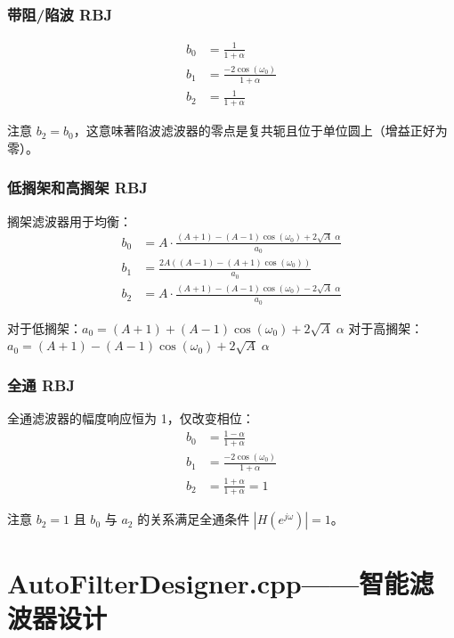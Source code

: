 ﻿\documentclass[12pt,a4paper,oneside]{ctexbook}
\begin{document}
\subsubsection{带阻/陷波 RBJ}

\[
\begin{aligned}
b_0 &= \frac{1}{1 + \alpha} \\
b_1 &= \frac{-2\cos(\omega_0)}{1 + \alpha} \\
b_2 &= \frac{1}{1 + \alpha}
\end{aligned}
\]

注意 \(b_2 = b_0\)，这意味著陷波滤波器的零点是复共轭且位于单位圆上（增益正好为零）。

\subsubsection{低搁架和高搁架 RBJ}

搁架滤波器用于均衡：
\[
\begin{aligned}
b_0 &= A \cdot \frac{(A+1) - (A-1)\cos(\omega_0) + 2\sqrt{A}\;\alpha}{a_0} \\
b_1 &= \frac{2A((A-1) - (A+1)\cos(\omega_0))}{a_0} \\
b_2 &= A \cdot \frac{(A+1) - (A-1)\cos(\omega_0) - 2\sqrt{A}\;\alpha}{a_0}
\end{aligned}
\]

对于低搁架：\(a_0 = (A+1) + (A-1)\cos(\omega_0) + 2\sqrt{A}\;\alpha\)
对于高搁架：\(a_0 = (A+1) - (A-1)\cos(\omega_0) + 2\sqrt{A}\;\alpha\)

\subsubsection{全通 RBJ}

全通滤波器的幅度响应恒为 1，仅改变相位：
\[
\begin{aligned}
b_0 &= \frac{1 - \alpha}{1 + \alpha} \\
b_1 &= \frac{-2\cos(\omega_0)}{1 + \alpha} \\
b_2 &= \frac{1 + \alpha}{1 + \alpha} = 1
\end{aligned}
\]

注意 \(b_2 = 1\) 且 \(b_0\) 与 \(a_2\) 的关系满足全通条件 \(|H(e^{j\omega})| = 1\)。

\clearpage

\section{AutoFilterDesigner.cpp——智能滤波器设计}
\end{document}
